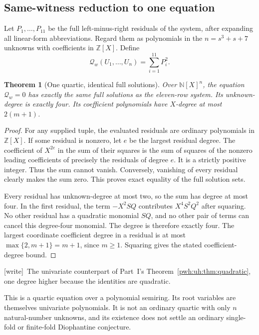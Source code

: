 \documentclass[11pt,letterpaper]{article}
\numberwithin{equation}{section}
\newtheorem{theorem}{Theorem}[section]
\theoremstyle{definition}
\newcommand{\N}{\mathbb N}
\newcommand{\Z}{\mathbb Z}
\newcommand{\wtag}{\textup{[write]}}
\begin{document}
\subsection{Same-witness reduction to one equation}

Let $P_1,\ldots,P_{11}$ be the full left-minus-right residuals of the
system, after expanding all linear-form abbreviations. Regard them as
polynomials in the $n=s^3+s+7$ unknowns with coefficients in $\Z[X]$.
Define
\begin{equation}
 \mathcal Q_w(U_1,\ldots,U_n)=\sum_{i=1}^{11}P_i^2.
 \label{pwh:oc:eq:quartic}
\end{equation}

\begin{theorem}[One quartic, identical full solutions]
\label{pwh:oc:thm:quartic}
Over $\N[X]^n$, the equation $\mathcal Q_w=0$ has exactly the same full
solutions as the eleven-row system. Its unknown-degree is exactly four.
Its coefficient polynomials have $X$-degree at most $2(m+1)$.
\end{theorem}

\begin{proof}
For any supplied tuple, the evaluated residuals are ordinary polynomials
in $\Z[X]$. If some residual is nonzero, let $e$ be the largest residual
degree. The coefficient of $X^{2e}$ in the sum of their squares is the
sum of squares of the nonzero leading coefficients of precisely the
residuals of degree $e$. It is a strictly positive integer. Thus the
sum cannot vanish. Conversely, vanishing of every residual clearly
makes the sum zero. This proves exact equality of the full solution sets.

Every residual has unknown-degree at most two, so the sum has degree at
most four. In the first residual, the term $-X^2SQ$ contributes
$X^4S^2Q^2$ after squaring. No other residual has a quadratic monomial
$SQ$, and no other pair of terms can cancel this degree-four monomial.
The degree is therefore exactly four. The largest coordinate coefficient
degree in a residual is at most $\max\{2,m+1\}=m+1$, since $m\ge1$.
Squaring gives the stated coefficient-degree bound.
\end{proof}

\wtag\ The univariate counterpart of Part~I's
Theorem~\ref{pwh:uh:thm:quadratic}, one degree higher because the
identities are quadratic.

This is a quartic equation over a polynomial semiring. Its root variables
are themselves univariate polynomials. It is not an ordinary quartic
with only $n$ natural-number unknowns, and its existence does not settle
an ordinary single-fold or finite-fold Diophantine conjecture.
\end{document}
